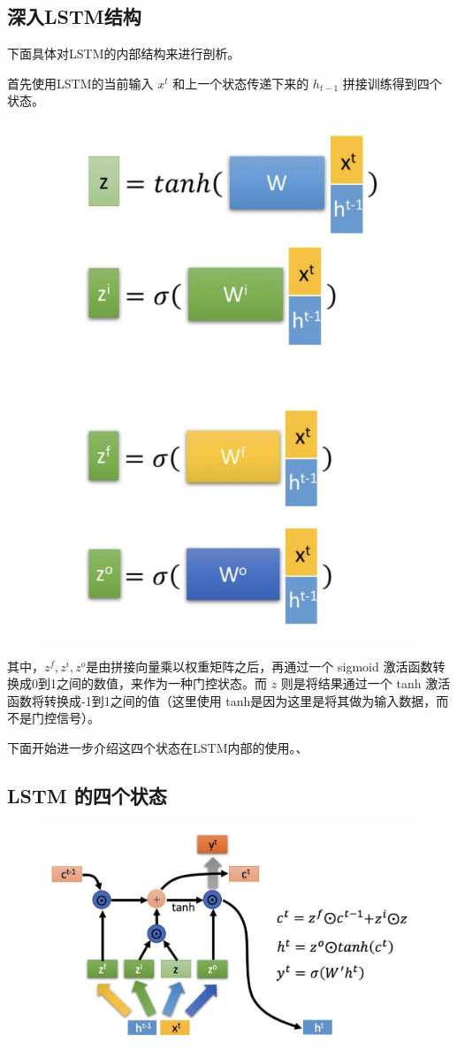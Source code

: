 \documentclass[12pt]{article}
\begin{document}
\subsection{深入LSTM结构}
下面具体对LSTM的内部结构来进行剖析。

首先使用LSTM的当前输入 $x^t$ 和上一个状态传递下来的 $h_{t-1}$ 拼接训练得到四个状态。
\begin{figure}[H]
    \centering
    \includegraphics[width=.4\textwidth]{fig/LSTM_Four_States.png}
\end{figure}

其中，$z^f, z^i, z^o$是由拼接向量乘以权重矩阵之后，再通过一个 sigmoid  激活函数转换成0到1之间的数值，来作为一种门控状态。而 $z$ 则是将结果通过一个 tanh 激活函数将转换成-1到1之间的值（这里使用 tanh是因为这里是将其做为输入数据，而不是门控信号）。

下面开始进一步介绍这四个状态在LSTM内部的使用。、
\subsection{LSTM 的四个状态}
\begin{figure}[H]
    \centering
    \includegraphics[width=.8\textwidth]{fig/LSTM_Four_States_Detail.png}
\end{figure}
\end{document}
